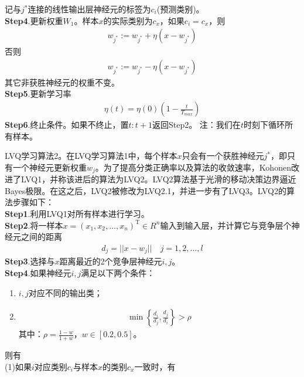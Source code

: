             记与$j^*$连接的线性输出层神经元的标签为$c_i$(预测类别)。\\
            \textbf{Step4}.更新权重$W_1$。样本$x$的实际类别为$c_x$，如果$c_i = c_x$，则
            \begin{align*}
            w_{j^*}:=w_{j^*}+\eta(x-w_{j^*})
            \end{align*}
            否则
            \begin{align*}
            w_{j^*}:=w_{j^*}-\eta(x-w_{j^*})
            \end{align*}
            其它非获胜神经元的权重不变。\\
            \textbf{Step5}.更新学习率
            \begin{align*}
            \eta(t) = \eta(0) \left( 1-\frac{t}{T_{max}} \right)
            \end{align*}
            \textbf{Step6}.终止条件。如果不终止，置$t:t+1$返回Step2。
            注：我们在$t$时刻下循环所有样本。
            \par
            LVQ学习算法2。在LVQ学习算法1中，每个样本$x$只会有一个获胜神经元$j^*$，即只有一个神经元更新权重$w_j$。为了提高分类正确率以及算法的收敛速率，Kohonen改进了LVQ1，并称该进后的算法为LVQ2。LVQ2算法基于光滑的移动决策边界逼近Bayes极限。在这之后，LVQ2被修改为LVQ2.1，并进一步有了LVQ3。LVQ2的算法步骤如下：\\
            \textbf{Step1}.利用LVQ1对所有样本进行学习。\\
            \textbf{Step2}.将一样本$x = (x_1,x_2,\dots,x_n)^\mathrm{T}\in R^n$输入到输入层，并计算它与竞争层个神经元之间的距离
            \begin{align*}
            d_j = ||x-w_j||\quad j=1,2,\dots,l
            \end{align*}
            \textbf{Step3}.选择与$x$距离最近的2个竞争层神经元$i,j$。\\
            \textbf{Step4}.如果神经元$i,j$满足以下两个条件：
            \begin{enumerate}
            \item $i,j$对应不同的输出类；
            \item
            \begin{align*}
            \min \left\{ \frac{d_i}{d_j} ,\frac{d_j}{d_i} \right\} > \rho
            \end{align*}
            其中：$\rho = \frac{1-w}{1+w}$，$w\in [0.2,0.5]$。
            \end{enumerate}
            则有\\
            (1)如果$i$对应类别$c_i$与样本$x$的类别$c_x$一致时，有
